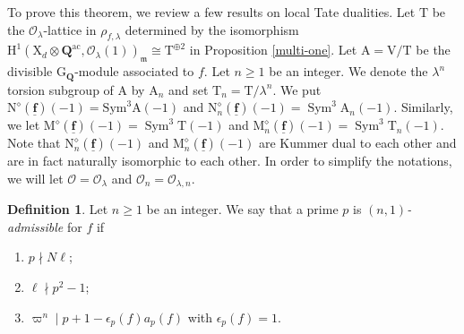 \documentclass[10pt]{amsart}
\numberwithin{equation}{section}
\theoremstyle{plain}
\numberwithin{equation}{section}
\theoremstyle{definition}
\newtheorem{definition}[theorem]{Definition}
\theoremstyle{remark}
\def\ac{\mathrm{ac}}
\def\frakm{\mathfrak{m}}
\def\ac{\mathrm{ac}}
\def\triplef{\underline{\mathbf{f}}}
\DeclareMathOperator{\Sym}{Sym}
\def\calO{\mathcal{O}}
\def\frakm{\mathfrak{m}}
\def\QQ{\mathbf{Q}}
\def\rmA{\mathrm{A}}
\def\rmG{\mathrm{G}}
\def\rmH{\mathrm{H}}
\def\rmM{\mathrm{M}}
\def\rmN{\mathrm{N}}
\def\rmX{\mathrm{X}}
\def\rmV{\mathrm{V}}
\def\rmT{\mathrm{T}}
\begin{document}
To prove this theorem, we review a few results on local Tate dualities. Let $\rmT$ be the $\calO_{\lambda}$-lattice in $\rho_{f, \lambda}$ determined by the isomorphism $\rmH^{1}(\rmX_{d}\otimes{\QQ^{\ac}}, \calO_{\lambda}(1))_{\frakm}\cong \rmT^{\oplus 2}$ in Proposition \ref{multi-one}. Let $\rmA=\rmV/\rmT$ be the divisible $\rmG_{\QQ}$-module associated to $f$. Let $n\geq 1$ be an integer. We denote  the $\lambda^{n}$ torsion subgroup of $\rmA$ by $\rmA_{n}$ and set $\rmT_{n}=\rmT/\lambda^{n}$. We put $\rmN^{\diamond}(\triplef)(-1)=\mathrm{Sym}^{3}\mathrm{A}(-1)$ and $\rmN^{\diamond}_{n}(\triplef)(-1)=\Sym^{3}\rmA_{n}(-1)$. Similarly, we let  $\rmM^{\diamond}(\triplef)(-1)=\Sym^{3}\rmT(-1)$ and $\rmM^{\diamond}_{n}(\triplef)(-1)=\Sym^{3}\rmT_{n}(-1)$. Note that $\rmN^{\diamond}_{n}(\triplef)(-1)$ and $\rmM^{\diamond}_{n}(\triplef)(-1)$ are Kummer dual to each other and are in fact naturally isomorphic to each other. In order to simplify the notations, we will let $\calO=\calO_{\lambda}$ and $\calO_{n}=\calO_{\lambda, n}$.

\begin{definition}\label{n-adm}
Let $n\geq 1$ be an integer. We say that a prime $p$ is \emph{$(n, 1)$-admissible} for $f$ if 
\begin{enumerate}
\item $p\nmid N\ell$;
\item $\ell\nmid p^{2}-1 $;
\item $\varpi^{n}\mid p+1-\epsilon_{p}(f)a_{p}(f)$ with $\epsilon_{p}(f)=1$. 
\end{enumerate}
\end{definition}
\end{document}
